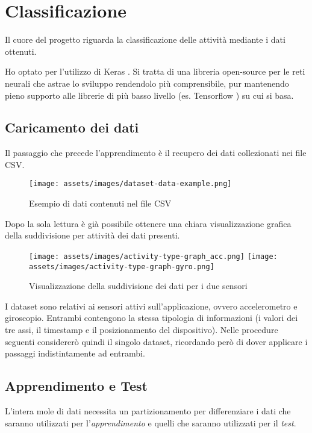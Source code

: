 \chapter{Classificazione}
\label{chapter:classification}

Il cuore del progetto riguarda la classificazione delle attività mediante i dati ottenuti. 

Ho optato per l'utilizzo di Keras \cite{keras}.
Si tratta di una libreria open-source per le reti neurali che astrae lo sviluppo rendendolo più comprensibile, 
pur mantenendo pieno supporto alle librerie di più basso livello (es. Tensorflow \cite{tensorflow}) su cui si basa.


\section{Caricamento dei dati}
Il passaggio che precede l'apprendimento è il recupero dei dati collezionati nei file CSV.

\begin{figure}[H]
    \centering
    \texttt{[image: assets/images/dataset-data-example.png]}
    \caption{Esempio di dati contenuti nel file CSV}
\end{figure}

Dopo la sola lettura è già possibile ottenere una chiara visualizzazione grafica della suddivisione per attività dei dati presenti.

\begin{figure}[H]
    \centering
    \texttt{[image: assets/images/activity-type-graph\_acc.png]}
    \centering
    \texttt{[image: assets/images/activity-type-graph-gyro.png]}
    \caption{Visualizzazione della suddivisione dei dati per i due sensori}
\end{figure}


\newpage
I dataset sono relativi ai sensori attivi sull'applicazione, ovvero accelerometro e giroscopio.
Entrambi contengono la stessa tipologia di informazioni (i valori dei tre assi, il timestamp e il posizionamento del dispositivo). 
Nelle procedure seguenti considererò quindi il singolo dataset, ricordando però di dover applicare i passaggi indistintamente ad entrambi.

\section{Apprendimento e Test}

L'intera mole di dati necessita un partizionamento per differenziare i dati che saranno utilizzati per 
l'\textit{apprendimento} e quelli che saranno utilizzati per il \textit{test}.

